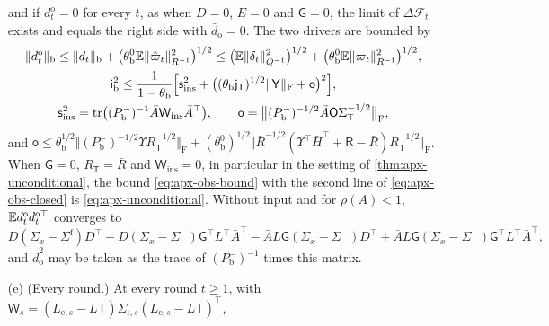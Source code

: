 \begin{theorem}
\begin{enumerate}
\begin{equation}
\end{equation}
and if $d^{\mathrm o}_t=0$ for every $t$, as when $D=0$, $E=0$ and $\mathsf G=0$, the limit of $\Delta\mathcal F_t$ exists and equals the right side with $\bar d_{\mathrm o}=0$. The two drivers are bounded by
\begin{equation}\label{eq:apx-obs-closed}
\begin{gathered}
\Vert d^{\mathrm o}_t\Vert_{\mathrm b}\le\Vert d_t\Vert_{\mathrm b}+\bigl(\theta^0_{\mathrm b}\E\Vert\hat\varpi_t\Vert^2_{\bar R^{-1}}\bigr)^{1/2}\le\bigl(\E\Vert\delta_t\Vert^2_{\bar Q^{-1}}\bigr)^{1/2}+\bigl(\theta^0_{\mathrm b}\E\Vert\varpi_t\Vert^2_{\bar R^{-1}}\bigr)^{1/2},\\
\mathsf i_{\mathrm b}^2\le\frac{1}{1-\theta_{\mathrm b}}\Bigl[\mathsf s_{\mathrm{ins}}^2+\bigl((\theta_{\mathrm b}\mathsf j_{\mathsf T})^{1/2}\Vert\mathsf Y\Vert_{\mathrm F}+\mathsf o\bigr)^2\Bigr],\\
\mathsf s_{\mathrm{ins}}^2=\tr\bigl((P^-_{\mathrm b})^{-1}\bar A\mathsf W_{\mathrm{ins}}\bar A^\top\bigr),\qquad\mathsf o=\bigl\Vert(P^-_{\mathrm b})^{-1/2}\bar A\mathsf O\Sigma_{\mathsf T}^{-1/2}\bigr\Vert_{\mathrm F},
\end{gathered}
\end{equation}
and $\mathsf o\le\theta_{\mathrm b}^{1/2}\Vert(P^-_{\mathrm b})^{-1/2}\Upsilon R_{\mathsf T}^{-1/2}\Vert_{\mathrm F}+(\theta^0_{\mathrm b})^{1/2}\Vert\bar R^{-1/2}(\Upsilon^\top\bar H^\top+\mathsf R-\bar R)R_{\mathsf T}^{-1/2}\Vert_{\mathrm F}$. When $\mathsf G=0$, $R_{\mathsf T}=\bar R$ and $\mathsf W_{\mathrm{ins}}=0$, in particular in the setting of \cref{thm:apx-unconditional}, the bound \eqref{eq:apx-obs-bound} with the second line of \eqref{eq:apx-obs-closed} is \eqref{eq:apx-unconditional}. Without input and for $\rho(A)<1$, $\E d^{\mathrm o}_td^{\mathrm o\top}_t$ converges to
\begin{equation}\label{eq:apx-obs-drive}
D(\Sigma_x-\Sigma^{\mathrm f})D^\top-D(\Sigma_x-\Sigma^-)\mathsf G^\top L^\top\bar A^\top-\bar AL\mathsf G(\Sigma_x-\Sigma^-)D^\top+\bar AL\mathsf G(\Sigma_x-\Sigma^-)\mathsf G^\top L^\top\bar A^\top ,
\end{equation}
and $\bar d_{\mathrm o}^2$ may be taken as the trace of $(P^-_{\mathrm b})^{-1}$ times this matrix.
\item[(e)] (Every round.) At every round $t\ge1$, with $\mathsf W_s=(L_{\mathrm e,s}-L\mathsf T)\Sigma_{\iota,s}(L_{\mathrm e,s}-L\mathsf T)^\top$,
\begin{equation}\label{eq:apx-obs-round}
\begin{gathered}

\end{gathered}
\end{equation}
\end{enumerate}
\end{theorem}
